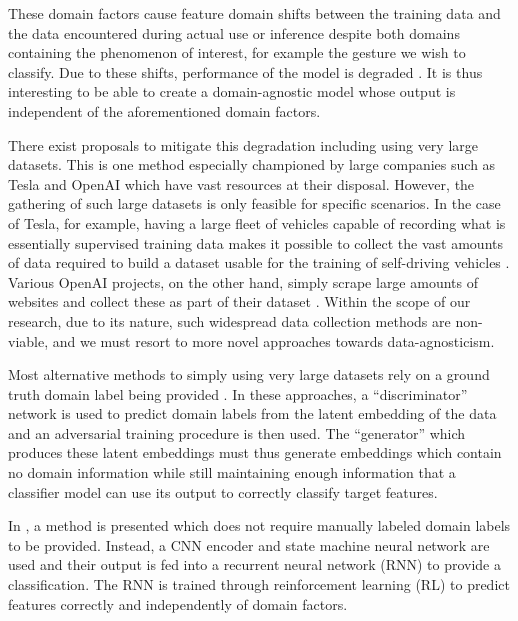 These domain factors cause feature domain shifts between the training data and the data encountered during actual use or inference despite both domains containing the phenomenon of interest, for example the gesture we wish to classify.
Due to these shifts, performance of the model is degraded \cite{chetty2011through,adib2013see,pu2013whole,adib20143d,he2015wig,jiang2018towards,zheng2019zero,jiang2020wigan,ma2021location}.
It is thus interesting to be able to create a domain-agnostic model whose output is independent of the aforementioned domain factors.

There exist proposals to mitigate this degradation including using very large datasets.
This is one method especially championed by large companies such as Tesla and OpenAI which have vast resources at their disposal.
However, the gathering of such large datasets is only feasible for specific scenarios.
In the case of Tesla, for example, having a large fleet of vehicles capable of recording what is essentially supervised training data makes it possible to collect the vast amounts of data required to build a dataset usable for the training of self-driving vehicles \cite{tesla2017data}.
Various OpenAI projects, on the other hand, simply scrape large amounts of websites and collect these as part of their dataset \cite{brown2020language}.
Within the scope of our research, due to its nature, such widespread data collection methods are non-viable, and we must resort to more novel approaches towards data-agnosticism.

Most alternative methods to simply using very large datasets rely on a ground truth domain label being provided \cite{jiang2018towards,xue2020deepmv}.
In these approaches, a ``discriminator'' network is used to predict domain labels from the latent embedding of the data and an adversarial training procedure is then used.
The ``generator'' which produces these latent embeddings must thus generate embeddings which contain no domain information while still maintaining enough information that a classifier model can use its output to correctly classify target features.

In \cite{ma2021location}, a method is presented which does not require manually labeled domain labels to be provided.
Instead, a CNN encoder and state machine neural network are used and their output is fed into a recurrent neural network (RNN) to provide a classification.
The RNN is trained through reinforcement learning (RL) to predict features correctly and independently of domain factors.

